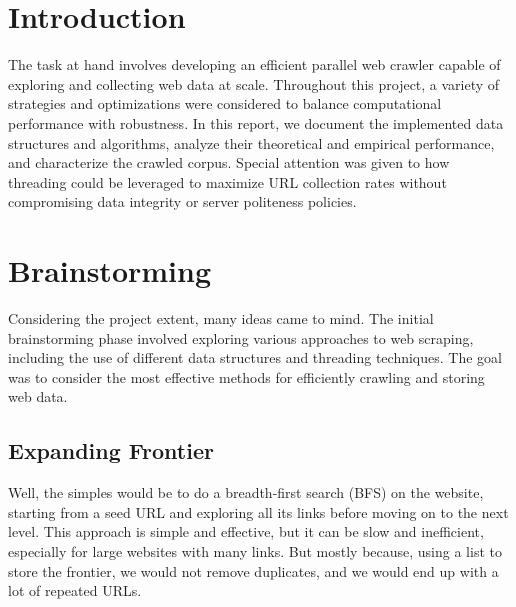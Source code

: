 \section{Introduction}




The task at hand involves developing an efficient parallel web crawler capable of exploring and collecting web data at scale. Throughout this project, a variety of strategies and optimizations were considered to balance computational performance with robustness. In this report, we document the implemented data structures and algorithms, analyze their theoretical and empirical performance, and characterize the crawled corpus. Special attention was given to how threading could be leveraged to maximize URL collection rates without compromising data integrity or server politeness policies.

\section{Brainstorming}

Considering the project extent, many ideas came to mind. The initial brainstorming phase involved exploring various approaches to web scraping, including the use of different data structures and threading techniques. The goal was to consider the most effective methods for efficiently crawling and storing web data.

\subsection{Expanding Frontier}

Well, the simples would be to do a breadth-first search (BFS) on the website, starting from a seed URL and exploring all its links before moving on to the next level. This approach is simple and effective, but it can be slow and inefficient, especially for large websites with many links. But mostly because, using a list to store the frontier, we would not remove duplicates, and we would end up with a lot of repeated URLs.

